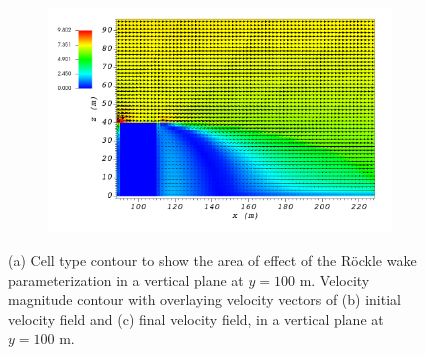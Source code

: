\begin{figure}[H]
\begin{subfigure}{\textwidth}
    \caption{}
    \end{subfigure}
    \begin{subfigure}{\textwidth}
    \centering
    \includegraphics[width=11.0cm,keepaspectratio]{Images/wake_y_100_1_final.png}
    \caption{}
    \end{subfigure}
    \caption{(a) Cell type contour to show the area of effect of the R\"{o}ckle wake parameterization in a vertical plane at $y=100$ m. Velocity magnitude contour with overlaying velocity vectors of (b) initial velocity field and (c) final velocity field, in a vertical plane at $y=100$ m.}
\end{figure}


